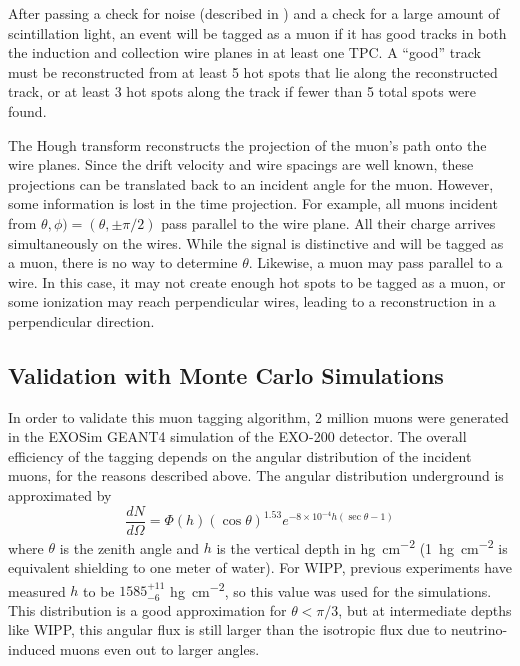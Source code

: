 \documentclass[herrin-thesis.tex]{subfiles}
\begin{document}
After passing a check for noise (described in ) and a check for a large amount of scintillation light, an event will be tagged as a muon if it has good tracks in both the induction and collection wire planes in at least one TPC. A ``good'' track must be reconstructed from at least 5 hot spots that lie along the reconstructed track, or at least 3 hot spots along the track if fewer than 5 total spots were found.

The Hough transform reconstructs the projection of the muon's path onto the wire planes. Since the drift velocity and wire spacings are well known, these projections can be translated back to an incident angle for the muon. However, some information is lost in the time projection. For example, all muons incident from \(\theta,\phi) = (\theta, \pm\pi/2)\) pass parallel to the wire plane. All their charge arrives simultaneously on the wires. While the signal is distinctive and will be tagged as a muon, there is no way to determine \(\theta\). Likewise, a muon may pass parallel to a wire. In this case, it may not create enough hot spots to be tagged as a muon, or some ionization may reach perpendicular wires, leading to a reconstruction in a perpendicular direction.

\subsection{Validation with Monte Carlo Simulations}
In order to validate this muon tagging algorithm, 2 million muons were generated in the EXOSim GEANT4 simulation of the EXO-200 detector. The overall efficiency of the tagging depends on the angular distribution of the incident muons, for the reasons described above. The angular distribution underground is approximated\cite{miyake:1973} by
\begin{equation}
\label{eq:muon_angular_distribution}
\frac{dN}{d\Omega} = \Phi(h) \left (\cos \theta \right)^{1.53}e^{-8\times10^{-4} h \left(\sec \theta -1\right)}
\end{equation}
where \(\theta\) is the zenith angle and \(h\) is the vertical depth in \si{\hecto\g\per\square\cm} (\SI{1}{\hecto\g\per\square\cm} is equivalent shielding to one meter of water). For WIPP, previous experiments have measured \(h\) to be \(1585^{+11}_{-6}\) \si{\hecto\g\per\square\cm}\cite{Esch:2004zj}, so this value was used for the simulations. This distribution is a good approximation for \(\theta < \pi/3\), but at intermediate depths like WIPP, this angular flux is still larger than the isotropic flux due to neutrino-induced muons even out to larger angles.
\end{document}
